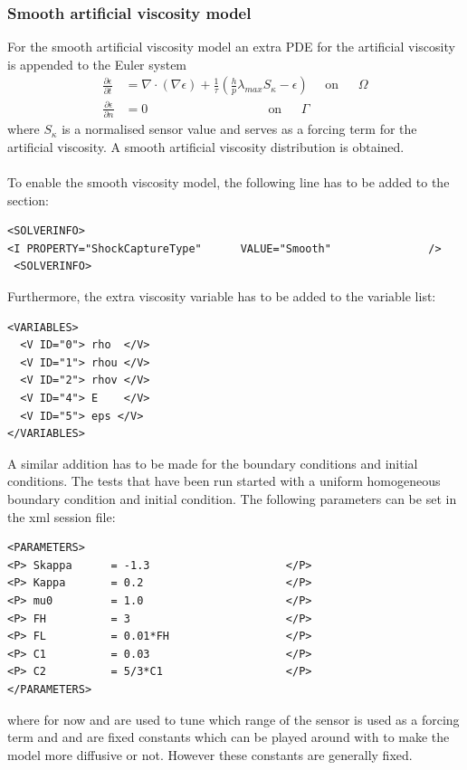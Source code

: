 \subsubsection{Smooth artificial viscosity model}
For the smooth artificial viscosity model an extra PDE for the artificial viscosity is appended to the Euler system
\begin{equation}\label{eq:euler}\begin{split}
\frac{\partial \epsilon}{\partial t} &= \nabla\cdot \left(\nabla \epsilon\right) + \frac{1}{\tau}\left(\frac{h}{p}\lambda_{max}S_\kappa - \epsilon\right)\	\	\	\	\	\	\textrm{on}\	\	\	\	\	\	\	\Omega\\
\frac{\partial \epsilon}{\partial n} &= 0\	\	\	\	\	\	\	\	\	\	\	\	\	\	\	\	\	\	\	\	\	\	\	\	\	\	\	\	\	\	\	\	\	\	\	\	\	\	\	\	\	\	\	\textrm{on}\	\	\	\	\	\	\	\Gamma
\end{split}
\end{equation}
where $S_\kappa$ is a normalised sensor value and serves as a forcing term for the artificial viscosity. A smooth artificial viscosity distribution is obtained.\\
\\
To enable the smooth viscosity model, the following line has to be added to the  section:
\begin{lstlisting}[style=XmlStyle]
 <SOLVERINFO>
<I PROPERTY="ShockCaptureType"      VALUE="Smooth"               />
 <SOLVERINFO>
\end{lstlisting}
Furthermore, the extra viscosity variable  has to be added to the variable list:
\begin{lstlisting}[style=XmlStyle]        
<VARIABLES>
  <V ID="0"> rho  </V>
  <V ID="1"> rhou </V>
  <V ID="2"> rhov </V>
  <V ID="4"> E    </V>
  <V ID="5"> eps </V>
</VARIABLES>
\end{lstlisting}
A similar addition has to be made for the boundary conditions and initial conditions. The tests that have been run started with a uniform homogeneous boundary condition and initial condition.
The following parameters can be set in the xml session file:
\begin{lstlisting}[style=XmlStyle]
<PARAMETERS>
<P> Skappa 	 	= -1.3                     </P>
<P> Kappa 	 	= 0.2                      </P> 
<P> mu0 	 	= 1.0                      </P>
<P> FH 	 	 	= 3                        </P>
<P> FL 	 	 	= 0.01*FH                  </P>
<P> C1 	 	 	= 0.03                     </P>
<P> C2 		 	= 5/3*C1                   </P>
</PARAMETERS>
\end{lstlisting}
where for now  and  are used to tune which range of the sensor is used as a forcing term and  and  are fixed constants which can be played around with to make the model more diffusive or not. However these constants are generally fixed.
